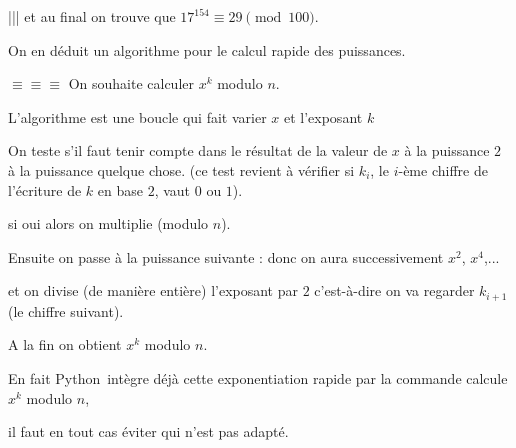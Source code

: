 |||
et au final on trouve que $17^{154} \equiv 29 \pmod {100}$.

\diapo

On en déduit un algorithme pour le calcul rapide des puissances.

$\equiv \equiv \equiv $
On souhaite calculer $x^k$ modulo $n$.

L'algorithme est une boucle qui fait varier $x$ et l'exposant $k$

On teste s'il faut tenir compte dans le résultat de la valeur de $x$ à la puissance $2$ à la puissance quelque chose.
(ce test revient à vérifier si $k_i$, le $i$-ème chiffre de l'écriture de $k$ en base $2$, vaut $0$ ou $1$).

si oui alors on multiplie (modulo $n$).

Ensuite on passe à la puissance suivante : donc on aura successivement $x^2$, $x^4$,...

et on divise (de manière entière) l'exposant par $2$ c'est-à-dire on va regarder $k_{i+1}$ (le chiffre suivant).


A la fin on obtient $x^k$ modulo $n$. 


\change
En fait Python\ intègre déjà cette exponentiation rapide par la commande  calcule $x^k$ modulo $n$,

\change
il faut en tout cas éviter  qui n'est pas adapté.


